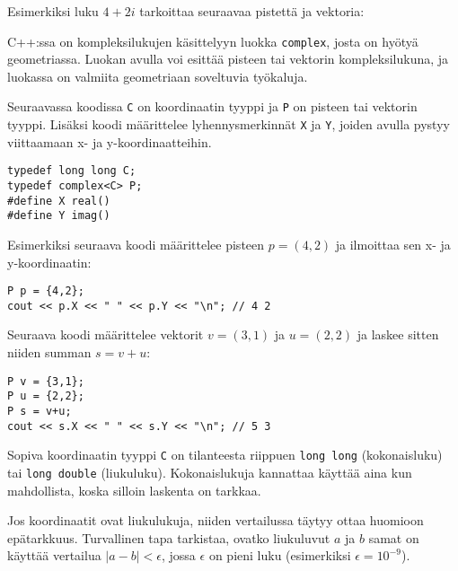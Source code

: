 Esimerkiksi luku $4+2i$ tarkoittaa seuraavaa
pistettä ja vektoria:

\begin{center}
\end{center}


C++:ssa on kompleksilukujen käsittelyyn luokka \texttt{complex},
josta on hyötyä geometriassa.
Luokan avulla voi esittää pisteen tai vektorin
kompleksilukuna, ja luokassa on valmiita
geometriaan soveltuvia työkaluja.

Seuraavassa koodissa \texttt{C} on koordinaatin tyyppi
ja \texttt{P} on pisteen tai vektorin tyyppi.
Lisäksi koodi määrittelee
lyhennysmerkinnät \texttt{X} ja \texttt{Y},
joiden avulla pystyy viittaamaan x- ja y-koordinaatteihin.

\begin{lstlisting}
typedef long long C;
typedef complex<C> P;
#define X real()
#define Y imag()
\end{lstlisting}

Esimerkiksi seuraava koodi määrittelee pisteen $p=(4,2)$
ja ilmoittaa sen x- ja y-koordinaatin:

\begin{lstlisting}
P p = {4,2};
cout << p.X << " " << p.Y << "\n"; // 4 2
\end{lstlisting}

Seuraava koodi määrittelee vektorit $v=(3,1)$
ja $u=(2,2)$ ja laskee sitten niiden summan $s=v+u$:

\begin{lstlisting}
P v = {3,1};
P u = {2,2};
P s = v+u;
cout << s.X << " " << s.Y << "\n"; // 5 3
\end{lstlisting}

Sopiva koordinaatin tyyppi \texttt{C} on tilanteesta
riippuen \texttt{long long} (kokonaisluku)
tai \texttt{long double} (liukuluku).
Kokonaislukuja kannattaa käyttää aina kun mahdollista,
koska silloin laskenta on tarkkaa.

Jos koordinaatit ovat liukulukuja,
niiden vertailussa täytyy ottaa huomioon epätarkkuus.
Turvallinen tapa tarkistaa,
ovatko liukuluvut $a$ ja $b$ samat
on käyttää vertailua $|a-b|<\epsilon$, jossa $\epsilon$
on pieni luku (esimerkiksi $\epsilon=10^{-9}$).

